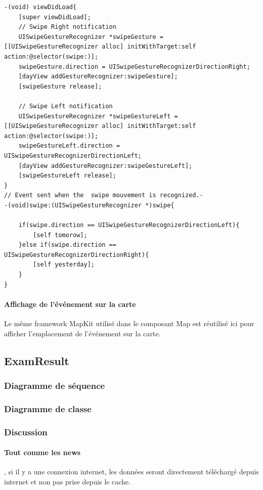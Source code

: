\begin{lstlisting}[name=Recherche dans UITableView  , label=searchTBV]
-(void) viewDidLoad{
    [super viewDidLoad];
    // Swipe Right notification
    UISwipeGestureRecognizer *swipeGesture = [[UISwipeGestureRecognizer alloc] initWithTarget:self action:@selector(swipe:)];
    swipeGesture.direction = UISwipeGestureRecognizerDirectionRight;
    [dayView addGestureRecognizer:swipeGesture];
    [swipeGesture release];
    
    // Swipe Left notification
    UISwipeGestureRecognizer *swipeGestureLeft = [[UISwipeGestureRecognizer alloc] initWithTarget:self action:@selector(swipe:)];
    swipeGestureLeft.direction = UISwipeGestureRecognizerDirectionLeft;
    [dayView addGestureRecognizer:swipeGestureLeft];
    [swipeGestureLeft release];
}
// Event sent when the  swipe mouvement is recognized.-
-(void)swipe:(UISwipeGestureRecognizer *)swipe{
    
    if(swipe.direction == UISwipeGestureRecognizerDirectionLeft){
        [self tomorow];
    }else if(swipe.direction == UISwipeGestureRecognizerDirectionRight){
        [self yesterday];   
    }
}
\end{lstlisting}
				\paragraph{Affichage de l'événement sur la carte}  Le même framework MapKit utilisé dans le composant Map est réutilisé ici pour afficher l'emplacement de l'événement sur la carte.

	\subsection{ExamResult}
					\subsubsection*{Diagramme de séquence}

					\subsubsection*{Diagramme de classe}
						 	
					\subsubsection*{Discussion}
					\paragraph{Tout comme les news}, si il y a une connexion internet, les données seront directement téléchargé depuis internet et non pas prise depuis le cache.
